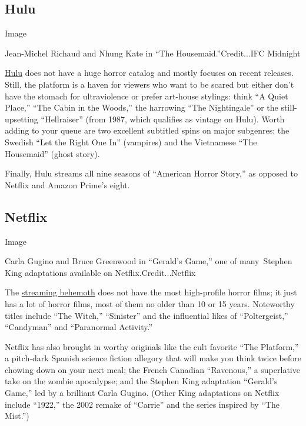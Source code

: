 \hypertarget{hulu}{%
\subsection{Hulu}\label{hulu}}

Image

Jean-Michel Richaud and Nhung Kate in ``The Housemaid.''Credit...IFC
Midnight

\href{https://www.hulu.com/}{Hulu} does not have a huge horror catalog
and mostly focuses on recent releases. Still, the platform is a haven
for viewers who want to be scared but either don't have the stomach for
ultraviolence or prefer art-house stylings: think ``A Quiet Place,''
``The Cabin in the Woods,'' the harrowing ``The Nightingale'' or the
still-upsetting ``Hellraiser'' (from 1987, which qualifies as vintage on
Hulu). Worth adding to your queue are two excellent subtitled spins on
major subgenres: the Swedish ``Let the Right One In'' (vampires) and the
Vietnamese ``The Housemaid'' (ghost story).

Finally, Hulu streams all nine seasons of ``American Horror Story,'' as
opposed to Netflix and Amazon Prime's eight.

\hypertarget{netflix}{%
\subsection{Netflix}\label{netflix}}

Image

Carla Gugino and Bruce Greenwood in ``Gerald's Game,'' one of
many~Stephen King adaptations available on Netflix.Credit...Netflix

The \href{https://www.netflix.com/}{streaming behemoth} does not have
the most high-profile horror films; it just has a lot of horror films,
most of them no older than 10 or 15 years. Noteworthy titles include
``The Witch,'' ``Sinister'' and the influential likes of
``Poltergeist,'' ``Candyman'' and ``Paranormal Activity.''

Netflix has also brought in worthy originals like the cult favorite
``The Platform,'' a pitch-dark Spanish science fiction allegory that
will make you think twice before chowing down on your next meal; the
French Canadian ``Ravenous,'' a superlative take on the zombie
apocalypse; and the Stephen King adaptation ``Gerald's Game,'' led by a
brilliant Carla Gugino. (Other King adaptations on Netflix include
``1922,'' the 2002 remake of ``Carrie'' and the series inspired by ``The
Mist.'')

